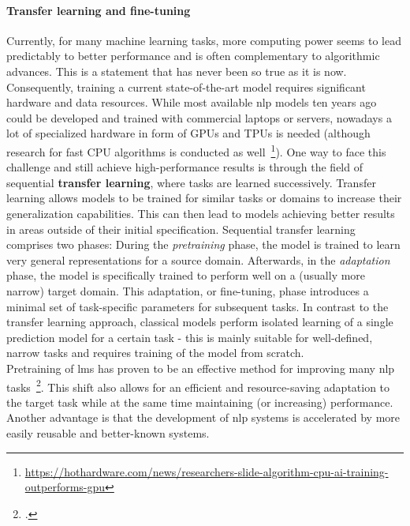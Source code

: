 \paragraph{Transfer learning and fine-tuning}
Currently, for many machine learning tasks, more computing power seems to lead predictably to better performance and is often complementary to algorithmic advances. This is a statement that has never been so true as it is now. Consequently, training a current state-of-the-art model requires significant hardware and data resources. While most available \gls{nlp} models ten years ago could be developed and trained with commercial laptops or servers, nowadays a lot of specialized hardware in form of GPUs and TPUs is needed (although research for fast CPU algorithms is conducted as well~\footnote{\url{https://hothardware.com/news/researchers-slide-algorithm-cpu-ai-training-outperforms-gpu}}). One way to face this challenge and still achieve high-performance results is through the field of sequential \textbf{transfer learning}, where tasks are learned successively. Transfer learning allows models to be trained for similar tasks or domains to increase their generalization capabilities. This can then lead to models achieving better results in areas outside of their initial specification. Sequential transfer learning comprises two phases: During the \textit{pretraining} phase, the model is trained to learn very general representations for a source domain. Afterwards, in the \textit{adaptation} phase, the model is specifically trained to perform well on a (usually more narrow) target domain. This adaptation, or fine-tuning, phase introduces a minimal set of task-specific parameters for subsequent tasks. In contrast to the transfer learning approach, classical models perform isolated learning of a single prediction model for a certain task - this is mainly suitable for well-defined, narrow tasks and requires training of the model from scratch. \\
Pretraining of \gls{lm}s has proven to be an effective method for improving many \gls{nlp} tasks~\footcite{DBLP:journals/corr/abs-1801-06146}. This shift also allows for an efficient and resource-saving adaptation to the target task while at the same time maintaining (or increasing) performance. Another advantage is that the development of \gls{nlp} systems is accelerated by more easily reusable and better-known systems.
